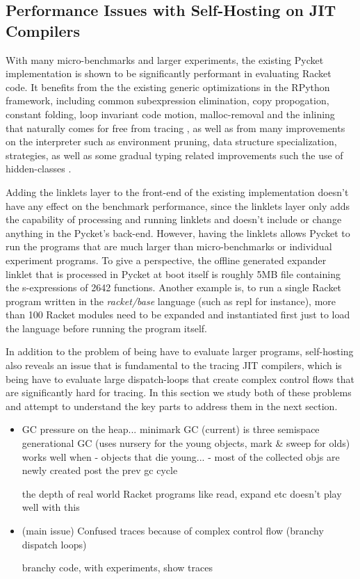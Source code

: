 \subsection{Performance Issues with Self-Hosting on JIT Compilers}
\label{subsec:performance}

With many micro-benchmarks and larger experiments, the existing Pycket
implementation is shown to be significantly performant in evaluating
Racket code. It benefits from the the existing generic optimizations
in the RPython framework, including common subexpression elimination,
copy propogation, constant folding, loop invariant code motion,
malloc-removal and the inlining that naturally comes for free from
tracing \cite{loop-aware:12, hotpath:06, malloc-removal:11}, as well
as from many improvements on the interpreter such as environment
pruning, data structure specialization, strategies, as well as some
gradual typing related improvements such the use of hidden-classes
\cite{pycket15, pycket17}.

Adding the linklets layer to the front-end of the existing
implementation doesn't have any effect on the benchmark performance,
since the linklets layer only adds the capability of processing and
running linklets and doesn't include or change anything in the
Pycket's back-end. However, having the linklets allows Pycket to run
the programs that are much larger than micro-benchmarks or individual
experiment programs. To give a perspective, the offline generated
expander linklet that is processed in Pycket at boot itself is roughly
5MB file containing the s-expressions of 2642 functions. Another
example is, to run a single Racket program written in the
\emph{racket/base} language (such as repl for instance), more than 100
Racket modules need to be expanded and instantiated first just to load
the language before running the program itself.

In addition to the problem of being have to evaluate larger programs,
self-hosting also reveals an issue that is fundamental to the tracing
JIT compilers, which is being have to evaluate large dispatch-loops
that create complex control flows that are significantly hard for
tracing. In this section we study both of these problems and attempt
to understand the key parts to address them in the next section.

\begin{itemize}
\item GC pressure on the heap... minimark GC (current) is three semispace generational GC (uses nursery for the young objects, mark \& sweep for olds)
  works well when
  - objects that die young...
  - most of the collected objs are newly created post the prev gc cycle


  the depth of real world Racket programs like
  read, expand etc doesn't play well with this

\item (main issue) Confused traces because of complex control flow
  (branchy dispatch loops)

  branchy code, with experiments, show traces

\end{itemize}
